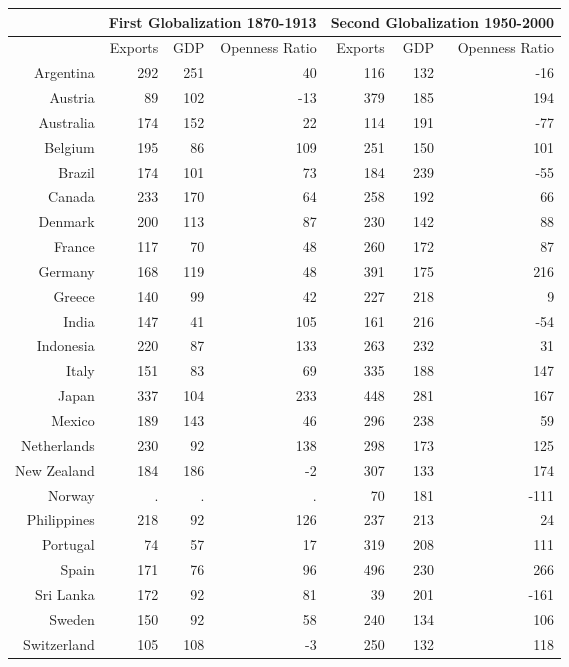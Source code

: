 \documentclass{article}
\begin{document}
\begin{table}
\centering
\begin{tabular}{|r|r|r|r|r|r|r|}
\hline
 & \multicolumn{3}{|c|}{First Globalization 1870-1913} & \multicolumn{3}{|c|}{Second Globalization 1950-2000}\\
\hline
 & Exports & GDP & Openness Ratio & Exports & GDP & Openness Ratio\\
\hline
Argentina & 292 & 251 & 40 & 116 & 132 & -16\\
\hline
Austria & 89 & 102 & -13 & 379 & 185 & 194\\
\hline
Australia & 174 & 152 & 22 & 114 & 191 & -77\\
\hline
Belgium & 195 & 86 & 109 & 251 & 150 & 101\\
\hline
Brazil & 174 & 101 & 73 & 184 & 239 & -55\\
\hline
Canada & 233 & 170 & 64 & 258 & 192 & 66\\
\hline
Denmark & 200 & 113 & 87 & 230 & 142 & 88\\
\hline
France & 117 & 70 & 48 & 260 & 172 & 87\\
\hline
Germany & 168 & 119 & 48 & 391 & 175 & 216\\
\hline
Greece & 140 & 99 & 42 & 227 & 218 & 9\\
\hline
India & 147 & 41 & 105 & 161 & 216 & -54\\
\hline
Indonesia & 220 & 87 & 133 & 263 & 232 & 31\\
\hline
Italy & 151 & 83 & 69 & 335 & 188 & 147\\
\hline
Japan & 337 & 104 & 233 & 448 & 281 & 167\\
\hline
Mexico & 189 & 143 & 46 & 296 & 238 & 59\\
\hline
Netherlands & 230 & 92 & 138 & 298 & 173 & 125\\
\hline
New Zealand & 184 & 186 & -2 & 307 & 133 & 174\\
\hline
Norway & . & . & . & 70 & 181 & -111\\
\hline
Philippines & 218 & 92 & 126 & 237 & 213 & 24\\
\hline
Portugal & 74 & 57 & 17 & 319 & 208 & 111\\
\hline
Spain & 171 & 76 & 96 & 496 & 230 & 266\\
\hline
Sri Lanka & 172 & 92 & 81 & 39 & 201 & -161\\
\hline
Sweden & 150 & 92 & 58 & 240 & 134 & 106\\
\hline
Switzerland & 105 & 108 & -3 & 250 & 132 & 118\\

\end{tabular}
\end{table}
\end{document}

